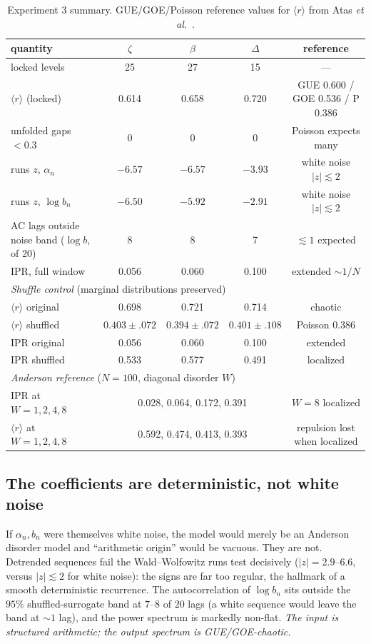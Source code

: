 \documentclass[aps,prx,reprint,floatfix]{revtex4-2}
\begin{document}
\begin{table}[h]
\centering\small
\begin{tabular}{lcccc}
\toprule
quantity & $\zeta$ & $\beta$ & $\Delta$ & reference \\
\midrule
locked levels & 25 & 27 & 15 & --- \\
$\langle r\rangle$ (locked) & 0.614 & 0.658 & 0.720 & GUE 0.600 / GOE 0.536 / P 0.386 \\
unfolded gaps $<0.3$ & 0 & 0 & 0 & Poisson expects many \\
runs $z$, $\alpha_n$ & $-6.57$ & $-6.57$ & $-3.93$ & white noise $|z|\lesssim2$ \\
runs $z$, $\log b_n$ & $-6.50$ & $-5.92$ & $-2.91$ & white noise $|z|\lesssim2$ \\
AC lags outside noise band ($\log b$, of 20) & 8 & 8 & 7 & $\lesssim1$ expected \\
IPR, full window & 0.056 & 0.060 & 0.100 & extended $\sim 1/N$ \\
\midrule
\multicolumn{5}{l}{\emph{Shuffle control} (marginal distributions preserved)}\\
$\langle r\rangle$ original & 0.698 & 0.721 & 0.714 & chaotic \\
$\langle r\rangle$ shuffled & $0.403\pm.072$ & $0.394\pm.072$ & $0.401\pm.108$ & Poisson 0.386 \\
IPR original & 0.056 & 0.060 & 0.100 & extended \\
IPR shuffled & 0.533 & 0.577 & 0.491 & localized \\
\midrule
\multicolumn{5}{l}{\emph{Anderson reference} ($N=100$, diagonal disorder $W$)}\\
IPR at $W=1,2,4,8$ & \multicolumn{3}{c}{0.028, 0.064, 0.172, 0.391} & $W=8$ localized \\
$\langle r\rangle$ at $W=1,2,4,8$ & \multicolumn{3}{c}{0.592, 0.474, 0.413, 0.393} & repulsion lost when localized\\
\bottomrule
\end{tabular}
\caption{Experiment 3 summary. GUE/GOE/Poisson reference values for
$\langle r\rangle$ from Atas \emph{et al.}~\cite{atas2013}.}
\label{tab:exp3}
\end{table}

\subsection{The coefficients are deterministic, not white noise}
\label{sec:e1}
If $\alpha_n,b_n$ were themselves white noise, the model would merely be an
Anderson disorder model and ``arithmetic origin'' would be vacuous. They are
not. Detrended sequences fail the Wald--Wolfowitz runs test decisively
($|z|=2.9$--$6.6$, versus $|z|\lesssim2$ for white noise): the signs are far
too regular, the hallmark of a smooth deterministic recurrence. The
autocorrelation of $\log b_n$ sits outside the $95\%$ shuffled-surrogate
band at $7$--$8$ of $20$ lags (a white sequence would leave the band at
$\sim1$ lag), and the power spectrum is markedly non-flat. \emph{The input
is structured arithmetic; the output spectrum is GUE/GOE-chaotic.}
\end{document}
